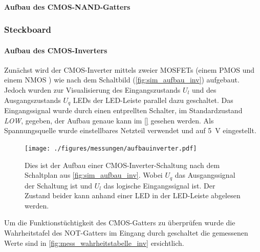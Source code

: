 \documentclass[12pt,english,ngerman]{scrartcl}
\begin{document}
\paragraph{Aufbau des CMOS-NAND-Gatters}

\begin{figure}[H]
  \centering
  \caption{}
  \label{fig:sim_aufbau_nand}
\end{figure}



\subsubsection{Steckboard}
\paragraph{Aufbau des CMOS-Inverters}\label{sec:mess_cmos}
Zunächst wird der CMOS-Inverter mittels zweier MOSFETs (einem PMOS \cite{} und
einem NMOS \cite{}) wie nach dem Schaltbild (\autoref{fig:sim_aufbau_inv})
aufgebaut. Jedoch wurden zur Visualisierung des Eingangszustands $U_l$ und des
Ausgangszustands $U_q$ LEDs der LED-Leiste parallel dazu geschaltet. Das
Eingangssignal wurde durch einen entprellten Schalter, im Standardzustand
\textit{LOW}, gegeben, der Aufbau genaue kann im \autoref{} gesehen werden. Als
Spannungsquelle wurde einstellbares Netzteil verwendet und auf \SI{5}{\volt}
eingestellt. 

\begin{figure}[H]
  \centering
    \texttt{[image: ./figures/messungen/aufbauinverter.pdf]}
  \caption{Dies ist der Aufbau einer CMOS-Inverter-Schaltung nach dem
  Schaltplan aus \autoref{fig:sim_aufbau_inv}. Wobei $U_q$ das Ausgangssignal
  der Schaltung ist  und $U_l$ das logische Eingangssignal ist. Der Zustand
  beider kann anhand einer LED in der LED-Leiste abgelesen werden.}
  \label{fig:mess_aufbau_inv}
\end{figure}


Um die Funktionstüchtigkeit des CMOS-Gatters zu überprüfen wurde die
Wahrheitstafel des NOT-Gatters im Eingang durch geschaltet die gemessenen Werte
sind in \autoref{fig:mess_wahrheitstabelle_inv} ersichtlich.
\end{document}
